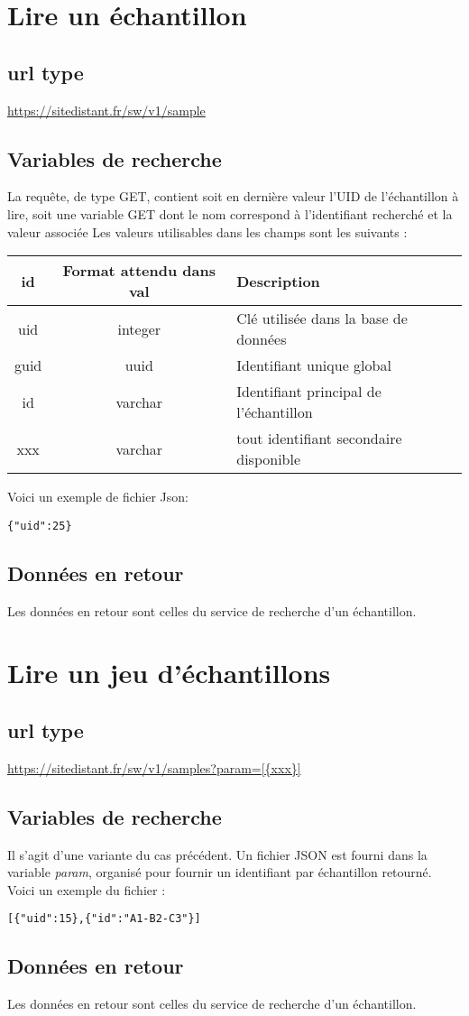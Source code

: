 \section{Lire un échantillon}

\subsection{url type}
\url{https://sitedistant.fr/sw/v1/sample}
\subsection{Variables de recherche}
La requête, de type GET, contient soit en dernière valeur l'UID de l'échantillon à lire, soit une variable GET dont le nom correspond à l'identifiant recherché et la valeur associée
Les valeurs utilisables dans les champs sont les suivants :
\begin{longtable}{|c|c|>{\raggedright\arraybackslash}p{6cm}|}
\hline 
id & Format attendu dans val & Description \\ 
\hline
uid & integer & Clé utilisée dans la base de données \\
\hline
guid & uuid & Identifiant unique global \\
\hline
id & varchar & Identifiant principal de l'échantillon\\
\hline
xxx & varchar & tout identifiant secondaire disponible\\
\hline \endhead

\end{longtable}

Voici un exemple de fichier Json:
\begin{lstlisting}
{"uid":25}
\end{lstlisting}
\subsection{Données en retour}
Les données en retour sont celles du service de recherche d'un échantillon.

\section{Lire un jeu d'échantillons}
\subsection{url type}
\url{https://sitedistant.fr/sw/v1/samples?param=[{xxx}]}
\subsection{Variables de recherche}
Il s'agit d'une variante du cas précédent. Un fichier JSON est fourni dans la variable \textit{param}, organisé pour fournir un identifiant par échantillon retourné. Voici un exemple du fichier :
\begin{lstlisting}
[{"uid":15},{"id":"A1-B2-C3"}]
\end{lstlisting}
\subsection{Données en retour}
Les données en retour sont celles du service de recherche d'un échantillon.



